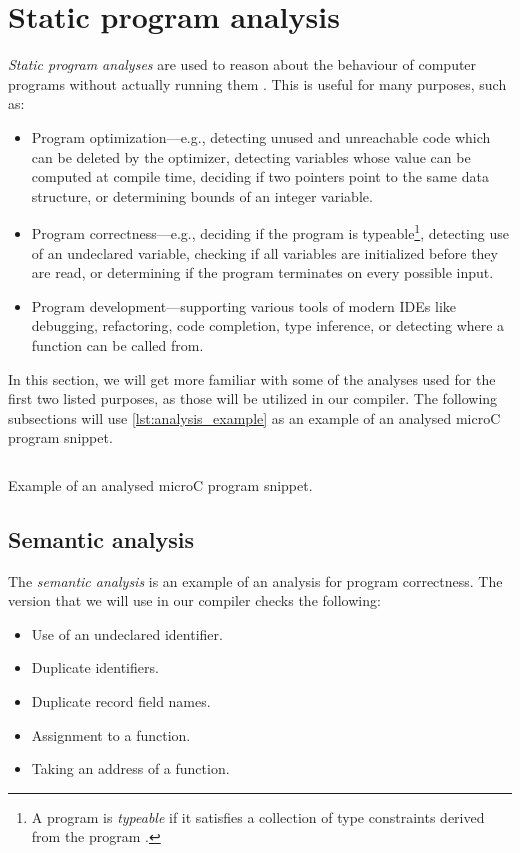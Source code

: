 \documentclass[thesis=M,english]{FITthesis}[2019/12/23]
\begin{document}
\section{Static program analysis}\label{sec:analyses}
\emph{Static program analyses} are used to reason about the behaviour of computer programs without actually running them \cite[Preface]{spa}. This is useful for many purposes, such as:
\begin{itemize}
    \item Program optimization---e.g., detecting unused and unreachable code which can be deleted by the optimizer, detecting variables whose value can be computed at compile time, deciding if two pointers point to the same data structure, or determining bounds of an integer variable.
    \item Program correctness---e.g., deciding if the program is typeable\footnote{A program is \emph{typeable} if it satisfies a collection of type constraints derived from the program \cite[Chap. 3]{spa}.}, detecting use of an undeclared variable, checking if all variables are initialized before they are read, or determining if the program terminates on every possible input.
    \item Program development---supporting various tools of modern IDEs like debugging, refactoring, code completion, type inference, or detecting where a function can be called from.
\end{itemize}

In this section, we will get more familiar with some of the analyses used for the first two listed purposes, as those will be utilized in our compiler. The following subsections will use \autoref{lst:analysis_example} as an example of an analysed microC program snippet.

\begin{listing}
	\inputminted[tabsize=2,breaklines,bgcolor=codebg,escapeinside=||]{python}{snippets/analysis_example.m}
	\caption{Example of an analysed microC program snippet.}
	\label{lst:analysis_example}
\end{listing}

\subsection{Semantic analysis}
The \emph{semantic analysis} is an example of an analysis for program correctness. The version that we will use in our compiler checks the following:
\begin{itemize}
    \item Use of an undeclared identifier.
    \item Duplicate identifiers.
    \item Duplicate record field names.
    \item Assignment to a function.
    \item Taking an address of a function.
\end{itemize}
\end{document}
